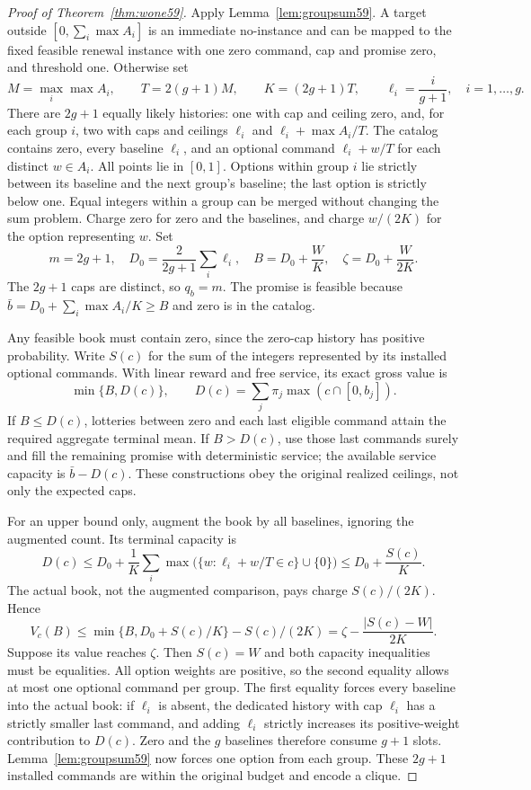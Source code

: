 \documentclass[11pt,letterpaper]{article}
\theoremstyle{definition}\newtheorem{remark}[theorem]{Remark}
\begin{document}
\begin{proof}[Proof of Theorem~\ref{thm:wone59}]
Apply Lemma~\ref{lem:groupsum59}. A target outside $[0,\sum_i\max A_i]$ is an immediate no-instance and can be mapped to the fixed feasible renewal instance with one zero command, cap and promise zero, and threshold one. Otherwise set
\[
 M=\max_i\max A_i,\qquad T=2(g+1)M,\qquad K=(2g+1)T,
 \qquad \ell_i=\frac{i}{g+1},\quad i=1,\ldots,g.
\]
There are $2g+1$ equally likely histories: one with cap and ceiling zero, and, for each group $i$, two with caps and ceilings $\ell_i$ and $\ell_i+\max A_i/T$. The catalog contains zero, every baseline $\ell_i$, and an optional command $\ell_i+w/T$ for each distinct $w\in A_i$. All points lie in $[0,1]$. Options within group $i$ lie strictly between its baseline and the next group's baseline; the last option is strictly below one. Equal integers within a group can be merged without changing the sum problem. Charge zero for zero and the baselines, and charge $w/(2K)$ for the option representing $w$. Set
\begin{equation}\label{eq:budgetreduction59}
 m=2g+1,\quad D_0=\frac{2}{2g+1}\sum_i\ell_i,\quad
 B=D_0+\frac{W}{K},\quad \zeta=D_0+\frac{W}{2K}.
\end{equation}
The $2g+1$ caps are distinct, so $q_b=m$. The promise is feasible because
$\bar b=D_0+\sum_i\max A_i/K\geq B$ and zero is in the catalog.

Any feasible book must contain zero, since the zero-cap history has positive probability. Write $S(c)$ for the sum of the integers represented by its installed optional commands. With linear reward and free service, its exact gross value is
\[
 \min\{B,D(c)\},\qquad D(c)=\sum_j\pi_j\max(c\cap[0,b_j]).
\]
If $B\leq D(c)$, lotteries between zero and each last eligible command attain the required aggregate terminal mean. If $B>D(c)$, use those last commands surely and fill the remaining promise with deterministic service; the available service capacity is $\bar b-D(c)$. These constructions obey the original realized ceilings, not only the expected caps.

For an upper bound only, augment the book by all baselines, ignoring the augmented count. Its terminal capacity is
\[
 D(c)\leq D_0+\frac{1}{K}\sum_i\max\bigl(\{w:\ell_i+w/T\in c\}\cup\{0\}\bigr)
 \leq D_0+\frac{S(c)}{K}.
\]
The actual book, not the augmented comparison, pays charge $S(c)/(2K)$. Hence
\begin{equation}\label{eq:keyparam59}
 V_c(B)\leq \min\{B,D_0+S(c)/K\}-S(c)/(2K)
       =\zeta-\frac{|S(c)-W|}{2K}.
\end{equation}
Suppose its value reaches $\zeta$. Then $S(c)=W$ and both capacity inequalities must be equalities. All option weights are positive, so the second equality allows at most one optional command per group. The first equality forces every baseline into the actual book: if $\ell_i$ is absent, the dedicated history with cap $\ell_i$ has a strictly smaller last command, and adding $\ell_i$ strictly increases its positive-weight contribution to $D(c)$. Zero and the $g$ baselines therefore consume $g+1$ slots. Lemma~\ref{lem:groupsum59} now forces one option from each group. These $2g+1$ installed commands are within the original budget and encode a clique.


\end{proof}
\end{document}

